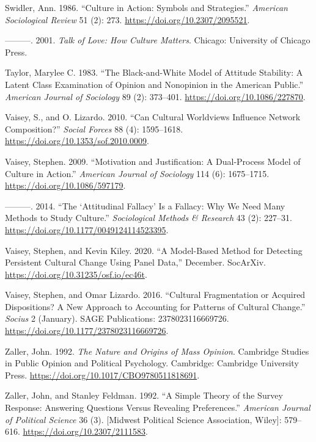 \documentclass[12pt,]{article}
\begin{document}
\leavevmode\hypertarget{ref-swidler1986}{}%
Swidler, Ann. 1986. ``Culture in Action: Symbols and Strategies.'' \emph{American Sociological Review} 51 (2): 273. \url{https://doi.org/10.2307/2095521}.

\leavevmode\hypertarget{ref-swidler2001}{}%
---------. 2001. \emph{Talk of Love: How Culture Matters}. Chicago: University of Chicago Press.

\leavevmode\hypertarget{ref-taylor1983}{}%
Taylor, Marylee C. 1983. ``The Black-and-White Model of Attitude Stability: A Latent Class Examination of Opinion and Nonopinion in the American Public.'' \emph{American Journal of Sociology} 89 (2): 373--401. \url{https://doi.org/10.1086/227870}.

\leavevmode\hypertarget{ref-vaisey2010}{}%
Vaisey, S., and O. Lizardo. 2010. ``Can Cultural Worldviews Influence Network Composition?'' \emph{Social Forces} 88 (4): 1595--1618. \url{https://doi.org/10.1353/sof.2010.0009}.

\leavevmode\hypertarget{ref-vaisey2009}{}%
Vaisey, Stephen. 2009. ``Motivation and Justification: A Dual‐Process Model of Culture in Action.'' \emph{American Journal of Sociology} 114 (6): 1675--1715. \url{https://doi.org/10.1086/597179}.

\leavevmode\hypertarget{ref-vaisey2014}{}%
---------. 2014. ``The `Attitudinal Fallacy' Is a Fallacy: Why We Need Many Methods to Study Culture.'' \emph{Sociological Methods \& Research} 43 (2): 227--31. \url{https://doi.org/10.1177/0049124114523395}.

\leavevmode\hypertarget{ref-vaisey2020}{}%
Vaisey, Stephen, and Kevin Kiley. 2020. ``A Model-Based Method for Detecting Persistent Cultural Change Using Panel Data,'' December. SocArXiv. \url{https://doi.org/10.31235/osf.io/ec46t}.

\leavevmode\hypertarget{ref-vaisey2016}{}%
Vaisey, Stephen, and Omar Lizardo. 2016. ``Cultural Fragmentation or Acquired Dispositions? A New Approach to Accounting for Patterns of Cultural Change.'' \emph{Socius} 2 (January). SAGE Publications: 2378023116669726. \url{https://doi.org/10.1177/2378023116669726}.

\leavevmode\hypertarget{ref-zaller1992}{}%
Zaller, John. 1992. \emph{The Nature and Origins of Mass Opinion}. Cambridge Studies in Public Opinion and Political Psychology. Cambridge: Cambridge University Press. \url{https://doi.org/10.1017/CBO9780511818691}.

\leavevmode\hypertarget{ref-zaller1992a}{}%
Zaller, John, and Stanley Feldman. 1992. ``A Simple Theory of the Survey Response: Answering Questions Versus Revealing Preferences.'' \emph{American Journal of Political Science} 36 (3). {[}Midwest Political Science Association, Wiley{]}: 579--616. \url{https://doi.org/10.2307/2111583}.
\end{document}
